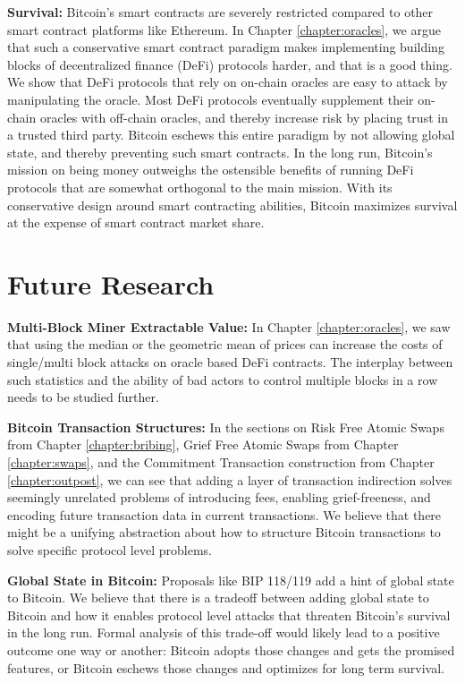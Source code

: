 \textbf{Survival:} Bitcoin's smart contracts are severely restricted compared to other smart contract platforms like Ethereum. In Chapter \ref{chapter:oracles}, we argue that such a conservative smart contract paradigm makes implementing building blocks of decentralized finance (DeFi) protocols harder, and that is a good thing. We show that DeFi protocols that rely on on-chain oracles are easy to attack by manipulating the oracle. Most DeFi protocols eventually supplement their on-chain oracles with off-chain oracles, and thereby increase risk by placing trust in a trusted third party. Bitcoin eschews this entire paradigm by not allowing global state, and thereby preventing such smart contracts. In the long run, Bitcoin's mission on being money outweighs the ostensible benefits of running DeFi protocols that are somewhat orthogonal to the main mission. With its conservative design around smart contracting abilities, Bitcoin maximizes survival at the expense of smart contract market share.

\section{Future Research}
\textbf{Multi-Block Miner Extractable Value:} In Chapter \ref{chapter:oracles}, we saw that using the median or the geometric mean of prices can increase the costs of single/multi block attacks on oracle based DeFi contracts. The interplay between such statistics and the ability of bad actors to control multiple blocks in a row needs to be studied further.

\textbf{Bitcoin Transaction Structures:} In the sections on Risk Free Atomic Swaps from Chapter \ref{chapter:bribing}, Grief Free Atomic Swaps from Chapter \ref{chapter:swaps}, and the Commitment Transaction construction from Chapter \ref{chapter:outpost}, we can see that adding a layer of transaction indirection solves seemingly unrelated problems of introducing fees, enabling grief-freeness, and encoding future transaction data in current transactions. We believe that there might be a unifying abstraction about how to structure Bitcoin transactions to solve specific protocol level problems.

\textbf{Global State in Bitcoin:} Proposals like BIP 118/119 add a hint of global state to Bitcoin. We believe that there is a tradeoff between adding global state to Bitcoin and how it enables protocol level attacks that threaten Bitcoin's survival in the long run. Formal analysis of this trade-off would likely lead to a positive outcome one way or another: Bitcoin adopts those changes and gets the promised features, or Bitcoin eschews those changes and optimizes for long term survival.

